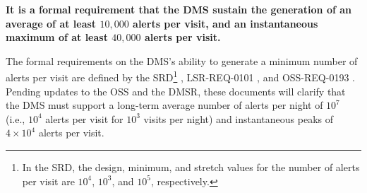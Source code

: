 \documentclass[DM,authoryear,toc]{lsstdoc}
\begin{document}
{\bf It is a formal requirement that the DMS sustain the generation of an average of at least $10,000$ alerts per visit, and an instantaneous maximum of at least $40,000$ alerts per visit.}

The formal requirements on the DMS's ability to generate a minimum number of alerts per visit are defined by the SRD\footnote{In the SRD, the design, minimum, and stretch values for the number of alerts per visit are $10^4$, $10^3$, and $10^5$, respectively.} , LSR-REQ-0101 , and OSS-REQ-0193 . Pending updates to the OSS and the DMSR, these documents will clarify that the DMS must support a long-term average number of alerts per night of $10^7$ (i.e., $10^4$ alerts per visit for $10^3$ visits per night) and instantaneous peaks of $4\times10^4$ alerts per visit.

\end{document}
